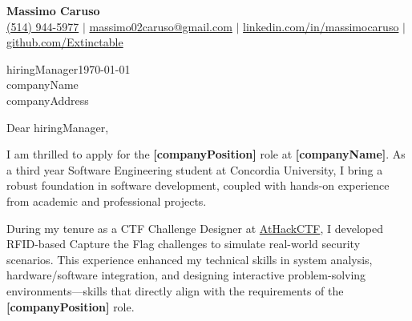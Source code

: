 \documentclass[10pt]{article}
\begin{document}
\newcommand{\fullname}{Massimo Caruso}
\newcommand{\phone}{(514) 944-5977}
\newcommand{\email}{massimo02caruso@gmail.com}
\newcommand{\linkedin}{linkedin.com/in/massimocaruso}
\newcommand{\github}{github.com/Extinctable}

\newcommand*{\hiringManager}{hiringManager}
\newcommand*{\company}{companyName}
\newcommand*{\address}{companyAddress}

\newcommand*{\position}{companyPosition}
\newcommand*{\companyDetails}{specific detail about the company, e.g., ”its innovative solutions in cloud computing”}
\newcommand*{\positionDetails}{specific detail about the role, e.g., ”work on scalable and efficient software solutions”}

\begin{center}
    {\Huge \textbf{\fullname}} \\
    \vspace{1mm}
    {\small 
    \faPhone \hspace{0mm} \href{tel:+15149445977}{\phone} $\vert$ 
    \faEnvelope \hspace{0mm} \href{mailto:massimo02caruso@gmail.com}{\email} $\vert$ 
    \faLinkedin \hspace{0mm} \href{https://linkedin.com/in/massimocaruso}{\linkedin} $\vert$ 
    \faGithub \hspace{0mm} \href{https://github.com/Extinctable}{\github}
    }
\end{center}


\vspace{1.5em}
\hiringManager \hfill \today \\
\company \\
\address 


\vspace{1.5em}
Dear \hiringManager,

I am thrilled to apply for the \textbf{[\position]} role at \textbf{[\company]}. As a third year Software Engineering student at Concordia University, I bring a robust foundation in software development, coupled with hands-on experience from academic and professional projects.

During my tenure as a CTF Challenge Designer at \href{https://www.athackctf.com}{AtHackCTF}, I developed RFID-based Capture the Flag challenges to simulate real-world security scenarios. This experience enhanced my technical skills in system analysis, hardware/software integration, and designing interactive problem-solving environments—skills that directly align with the requirements of the \textbf{[\position]} role.
\end{document}
